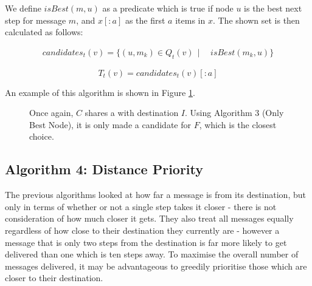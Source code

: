 \documentclass[bsc,frontabs,twoside,singlespacing,parskip,deptreport]{infthesis}     %
\begin{document}
We define $isBest(m, u)$ as a predicate which is true if node $u$ is the best next step for message $m$, and $x[:a]$ as the first $a$ items in $x$. The shown set is then calculated as follows:

\begin{equation}
\begin{split}
candidates_{t}(v) = \{ (u, m_{k}) \in Q_{t}(v) \:\: | \:\: & isBest(m_{k}, u) \}
\end{split}
\end{equation}

\begin{equation}
T_{t}(v) = candidates_{t}(v)[:a]
\end{equation}

An example of this algorithm is shown in Figure \ref{fig:alg_3_example}.

\begin{figure}[h]
\centering
{}
\caption{Once again, $C$ shares a with destination $I$. Using Algorithm 3 (Only Best Node), it is only made a candidate for $F$, which is the closest choice.}
\label{fig:alg_3_example}
\end{figure}

\subsection{Algorithm 4: Distance Priority}
The previous algorithms looked at how far a message is from its destination, but only in terms of whether or not a single step takes it closer - there is not consideration of how much closer it gets. They also treat all messages equally regardless of how close to their destination they currently are - however a message that is only two steps from the destination is far more likely to get delivered than one which is ten steps away. To maximise the overall number of messages delivered, it may be advantageous to greedily prioritise those which are closer to their destination.
\end{document}
